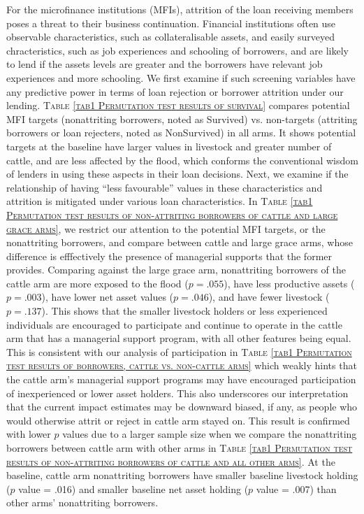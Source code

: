 	For the microfinance institutions (MFIs), attrition of the loan receiving members poses a threat to their business continuation. Financial institutions often use observable characteristics, such as collateralisable assets, and easily surveyed chracteristics, such as job experiences and schooling of borrowers, and are likely to lend if the assets levels are greater and the borrowers have relevant job experiences and more schooling. We first examine if such screening variables have any predictive power in terms of loan rejection or borrower attrition under our lending. \textsc{\normalsize Table \ref{tab1 Permutation test results of survival}} compares potential MFI targets (nonattriting borrowers, noted as \textsf{Survived}) vs. non-targets (attriting borrowers or loan rejecters, noted as \textsf{NonSurvived}) in all arms. It shows potential targets at the baseline have larger values in livestock and greater number of cattle, and are less affected by the flood, which conforms the conventional wisdom of lenders in using these aspects in their loan decisions. Next, we examine if the relationship of having ``less favourable'' values in these characteristics and attrition is mitigated under various loan characteristics. In \textsc{\normalsize Table \ref{tab1 Permutation test results of non-attriting borrowers of cattle and large grace arms}}, we restrict our attention to the potential MFI targets, or the nonattriting borrowers, and compare between \textsf{cattle} and \textsf{large grace} arms, whose difference is efffectively the presence of managerial supports that the former provides. \label{PageOfAttrition}%
	Comparing against the \textsf{large grace} arm, nonattriting borrowers of the \textsf{cattle} arm are more exposed to the flood ($p=.055$), have less productive assets ($p=.003$), have lower net asset values ($p=.046$), and have fewer livestock ($p=.137$). This shows that the smaller livestock holders or less experienced individuals are encouraged to participate and continue to operate in the \textsf{cattle} arm that has a managerial support program, with all other features being equal. This is consistent with our analysis of participation in \textsc{\normalsize Table \ref{tab1 Permutation test results of borrowers, cattle vs. non-cattle arms}} which weakly hints that the \textsf{cattle} arm's managerial support programs may have encouraged participation of inexperienced or lower asset holders. This also underscores our interpretation that the current impact estimates may be downward biased, if any, as people who would otherwise attrit or reject in cattle arm stayed on. This result is confirmed with lower $p$ values due to a larger sample size when we compare the nonattriting borrowers between \textsf{cattle} arm with other arms in \textsc{\normalsize Table \ref{tab1 Permutation test results of non-attriting borrowers of cattle and all other arms}}. At the baseline, \textsf{cattle} arm nonattriting borrowers have smaller baseline livestock holding ($p$ value = .016) and smaller baseline net asset holding ($p$ value = .007) than other arms' nonattriting borrowers. 


